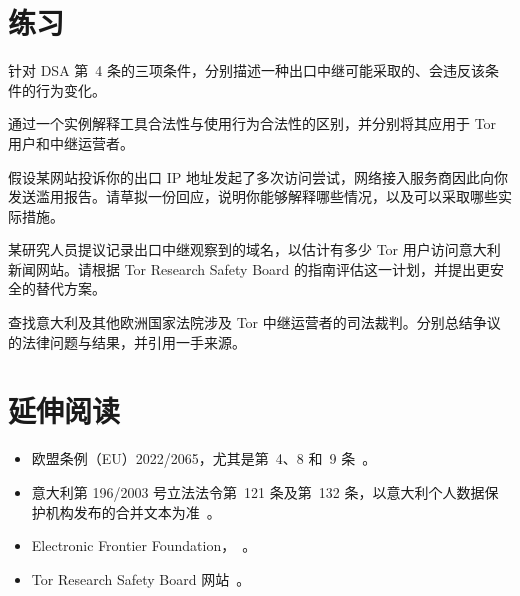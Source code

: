 \section*{练习}

\begin{esercizio}[1]\label{es:25-condizioni}
针对 DSA 第~4 条的三项条件，分别描述一种出口中继可能采取的、会违反该条件的行为变化。
\end{esercizio}

\begin{esercizio}[1]\label{es:25-strumento}
通过一个实例解释工具合法性与使用行为合法性的区别，并分别将其应用于 Tor 用户和中继运营者。
\end{esercizio}

\begin{esercizio}[2]\label{es:25-segnalazione}
假设某网站投诉你的出口 IP 地址发起了多次访问尝试，网络接入服务商因此向你发送滥用报告。请草拟一份回应，说明你能够解释哪些情况，以及可以采取哪些实际措施。
\end{esercizio}

\begin{esercizio}[2]\label{es:25-esperimento}
某研究人员提议记录出口中继观察到的域名，以估计有多少 Tor 用户访问意大利新闻网站。请根据 Tor Research Safety Board 的指南评估这一计划，并提出更安全的替代方案。
\end{esercizio}

\begin{esercizio}[3]\label{es:25-ricerca}
查找意大利及其他欧洲国家法院涉及 Tor 中继运营者的司法裁判。分别总结争议的法律问题与结果，并引用一手来源。
\end{esercizio}

\section*{延伸阅读}
\begin{itemize}
  \item 欧盟条例（EU）2022/2065，尤其是第~4、8 和~9 条~\cite{dsa2022}。
  \item 意大利第 196/2003 号立法法令第~121 条及第~132 条，以意大利个人数据保护机构发布的合并文本为准~\cite{codiceprivacy}。
  \item Electronic Frontier Foundation，~\cite{efflegalfaq}。
  \item Tor Research Safety Board 网站~\cite{trsb}。
\end{itemize}
